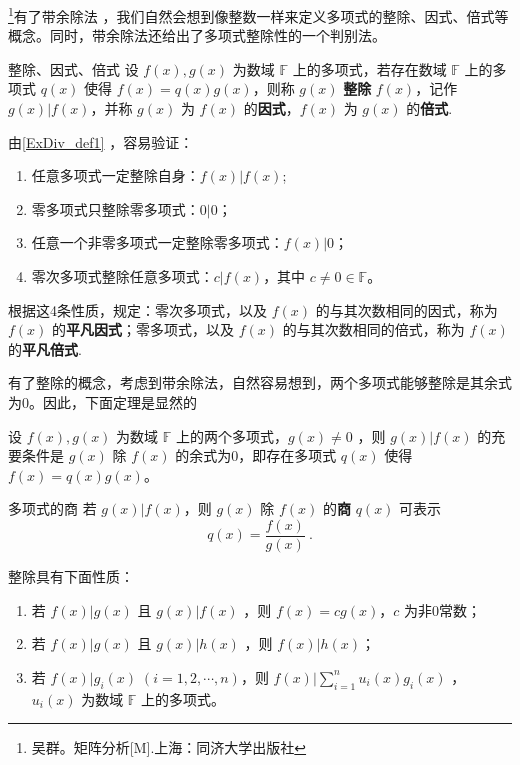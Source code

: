 

\footnote{吴群。矩阵分析[M].上海：同济大学出版社}有了带余除法 ，我们自然会想到像整数一样来定义多项式的整除、因式、倍式等概念。同时，带余除法还给出了多项式整除性的一个判别法。
\begin{definition}{整除、因式、倍式}\label{ExDiv_def1}
设 $f(x),g(x)$ 为数域 $\mathbb{F}$ 上的多项式，若存在数域 $\mathbb{F}$ 上的多项式 $q(x)$ 使得 $f(x)=q(x)g(x)$，则称 $g(x)$ \textbf{整除} $f(x)$，记作 $g(x)|f(x)$，并称 $g(x)$ 为 $f(x)$ 的\textbf{因式}，$f(x)$ 为 $g(x)$ 的\textbf{倍式}.
\end{definition}
由\autoref{ExDiv_def1} ，容易验证：
\begin{enumerate}
\item 任意多项式一定整除自身：$f(x)|f(x)$;
\item 零多项式只整除零多项式：$0|0$；
\item 任意一个非零多项式一定整除零多项式：$f(x)|0$；
\item 零次多项式整除任意多项式：$c|f(x)$，其中 $c\neq0\in\mathbb{F}$。
\end{enumerate}
根据这4条性质，规定：零次多项式，以及 $f(x)$ 的与其次数相同的因式，称为 $f(x)$ 的\textbf{平凡因式}；零多项式，以及 $f(x)$ 的与其次数相同的倍式，称为 $f(x)$ 的\textbf{平凡倍式}.

有了整除的概念，考虑到带余除法，自然容易想到，两个多项式能够整除是其余式为0。因此，下面定理是显然的
\begin{theorem}{}
设 $f(x),g(x)$ 为数域 $\mathbb{F}$ 上的两个多项式，$g(x)\neq 0$ ，则 $g(x)|f(x)$ 的充要条件是 $g(x)$ 除 $f(x)$ 的余式为0，即存在多项式 $q(x)$ 使得 $f(x)=q(x)g(x)$。
\end{theorem}
\begin{definition}{多项式的商}
若 $g(x)|f(x)$，则 $g(x)$ 除 $f(x)$ 的\textbf{商} $q(x)$ 可表示 
\begin{equation}
q(x)=\frac{f(x)}{g(x)}~.
\end{equation}

\end{definition}

整除具有下面性质：
\begin{enumerate}
\item 若 $f(x)|g(x)$ 且 $g(x)|f(x)$ ，则 $f(x)=cg(x)$，$c$ 为非0常数；
\item 若 $f(x)|g(x)$ 且 $g(x)|h(x)$ ，则 $f(x)|h(x)$；
\item 若 $f(x)|g_i(x)\;(i=1,2,\cdots,n)$，则 $f(x)|\sum\limits_{i=1}^{n}u_i(x)g_i(x)$ ， $u_i(x)$ 为数域 $\mathbb{F}$ 上的多项式。
\end{enumerate}

